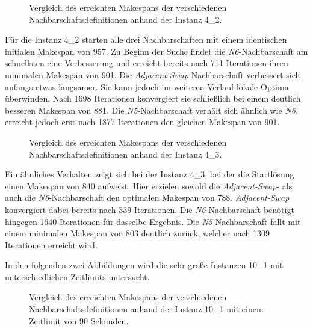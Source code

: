 \begin{figure}[H]
    \centering
    
    \caption{Vergleich des erreichten Makespans der verschiedenen Nachbarschaftsdefinitionen anhand der Instanz 4\_2.}
    \label{fig:neighborhood_4_2_comparison}
\end{figure}

Für die Instanz 4\_2 starten alle drei Nachbarschaften mit einem identischen initialen Makespan von 957.
Zu Beginn der Suche findet die \emph{N6}-Nachbarschaft am schnellsten eine Verbesserung und erreicht bereits nach 711 Iterationen ihren minimalen Makespan von 901.
Die \emph{Adjacent-Swap}-Nachbarschaft verbessert sich anfangs etwas langsamer.
Sie kann jedoch im weiteren Verlauf lokale Optima überwinden.
Nach 1698 Iterationen konvergiert sie schließlich bei einem deutlich besseren Makespan von 881.
Die \emph{N5}-Nachbarschaft verhält sich ähnlich wie \emph{N6}, erreicht jedoch erst nach 1877 Iterationen den gleichen Makespan von 901.

\begin{figure}[H]
    \centering
    
    \caption{Vergleich des erreichten Makespans der verschiedenen Nachbarschaftsdefinitionen anhand der Instanz 4\_3.}
    \label{fig:neighborhood_4_3_comparison}
\end{figure}

Ein ähnliches Verhalten zeigt sich bei der Instanz 4\_3, bei der die Startlösung einen Makespan von 840 aufweist.
Hier erzielen sowohl die \emph{Adjacent-Swap}- als auch die \emph{N6}-Nachbarschaft den optimalen Makespan von 788.
\emph{Adjacent-Swap} konvergiert dabei bereits nach 339 Iterationen.
Die \emph{N6}-Nachbarschaft benötigt hingegen 1640 Iterationen für dasselbe Ergebnis.
Die \emph{N5}-Nachbarschaft fällt mit einem minimalen Makespan von 803 deutlich zurück, welcher nach 1309 Iterationen erreicht wird.

In den folgenden zwei Abbildungen wird die sehr große Instanzen 10\_1 mit unterschiedlichen Zeitlimits untersucht.

\begin{figure}[H]
    \centering
    
    \caption{Vergleich des erreichten Makespans der verschiedenen Nachbarschaftsdefinitionen anhand der Instanz 10\_1 mit einem Zeitlimit von 90 Sekunden.}
    \label{fig:neighborhood_10_1_comparison_90}
\end{figure}

